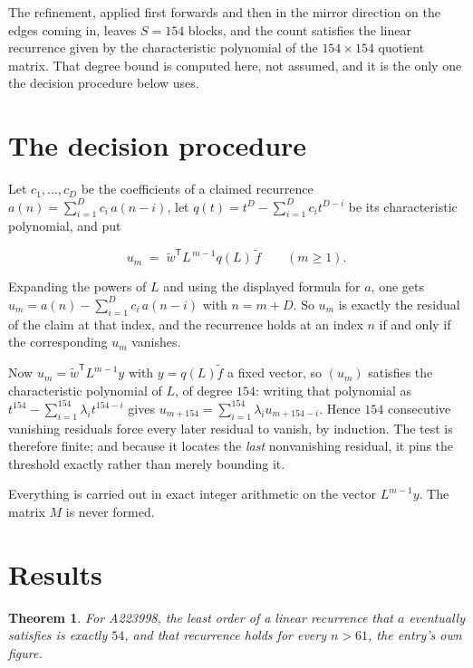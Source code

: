 \documentclass[11pt]{article}
\newtheorem{theorem}{Theorem}
\theoremstyle{definition}
\begin{document}
The refinement, applied first forwards and then in the mirror direction on the edges coming in, leaves $S = 154$ blocks, and the count satisfies the linear recurrence given by the characteristic polynomial of the $154 \times 154$ quotient matrix. That degree bound is computed here, not assumed, and it is the only one the decision procedure below uses.

\section{The decision procedure}

Let $c_1,\dots,c_D$ be the coefficients of a claimed recurrence $a(n) = \sum_{i=1}^{D} c_i\,a(n-i)$, let $q(t) = t^{D} - \sum_{i=1}^{D} c_i t^{D-i}$ be its characteristic polynomial, and put

\[u_m \;=\; \tilde w^{\mathsf T} L^{\,m-1} q(L)\,\tilde f \qquad (m \ge 1).\]

Expanding the powers of $L$ and using the displayed formula for $a$, one gets $u_m = a(n) - \sum_{i=1}^{D} c_i\,a(n-i)$ with $n = m + D$. So $u_m$ is exactly the residual of the claim at that index, and the recurrence holds at an index $n$ if and only if the corresponding $u_m$ vanishes.

Now $u_m = \tilde w^{\mathsf T} L^{m-1} y$ with $y = q(L)\tilde f$ a fixed vector, so $(u_m)$ satisfies the characteristic polynomial of $L$, of degree $154$: writing that polynomial as $t^{154} - \sum_{i=1}^{154} \lambda_i t^{154-i}$ gives $u_{m+154} = \sum_{i=1}^{154} \lambda_i u_{m+154-i}$. Hence $154$ consecutive vanishing residuals force every later residual to vanish, by induction. The test is therefore finite; and because it locates the {\itshape last} nonvanishing residual, it pins the threshold exactly rather than merely bounding it.

Everything is carried out in exact integer arithmetic on the vector $L^{m-1}y$. The matrix $M$ is never formed.

\section{Results}

\begin{theorem} For A223998, the least order of a linear recurrence that $a$ eventually satisfies is exactly $54$, and that recurrence holds for every $n > 61$, the entry's own figure.\end{theorem}
\end{document}
